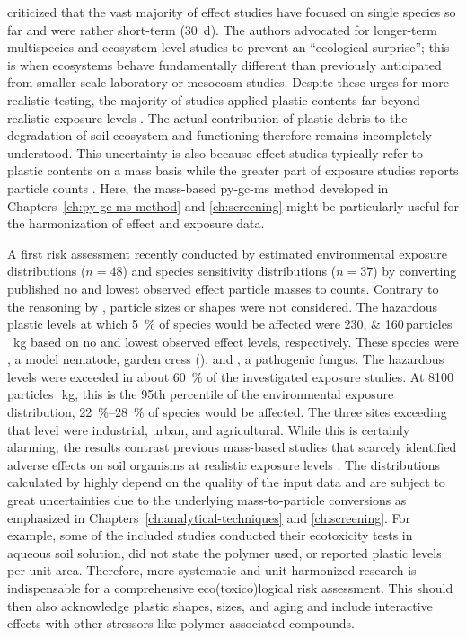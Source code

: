 \citet{BahoMicroplastics2021} criticized that the vast majority of effect studies have focused on single species so far and were rather short-term (\SI{30}{\day}). The authors advocated for longer-term multispecies and ecosystem level studies to prevent an ``ecological surprise''; this is when ecosystems behave fundamentally different than previously anticipated from smaller-scale laboratory or mesocosm studies. Despite these urges for more realistic testing, the majority of studies applied plastic contents far beyond realistic exposure levels \citep{BuksWhat2020}. The actual contribution of plastic debris to the degradation of soil ecosystem and functioning therefore remains incompletely understood. This uncertainty is also because effect studies typically refer to plastic contents on a mass basis while the greater part of exposure studies reports particle counts \citep{LeuschConverting2021}. Here, the mass-based \ac{py-gc-ms} method developed in Chapters~\ref{ch:py-gc-ms-method} and \ref{ch:screening} might be particularly useful for the harmonization of effect and exposure data.

A first risk assessment recently conducted by \citet{JacquesProbabilistic2021} estimated environmental exposure distributions ($n = 48$) and species sensitivity distributions ($n = 37$) by converting published no and lowest observed effect particle masses to counts. Contrary to the reasoning by \citet{BuksWhat2020}, particle sizes or shapes were not considered. The hazardous plastic levels at which \SI{5}{\percent} of species would be affected were \numlist{230;160}\,particles\,\si{\per\kilo\gram} based on no and lowest observed effect levels, respectively. These species were , a model nematode, garden cress (), and , a pathogenic fungus. The hazardous levels were exceeded in about \SI{60}{\percent} of the investigated exposure studies. At \num{8100}\,particles\,\si{\per\kilo\gram}, this is the \num{95}th percentile of the environmental exposure distribution, \SIrange{22}{28}{\percent} of species would be affected. The three sites exceeding that level were industrial, urban, and agricultural.
While this is certainly alarming, the results contrast previous mass-based studies that scarcely identified adverse effects on soil organisms at realistic exposure levels \citep{BuksWhat2020}. The distributions calculated by \citet{JacquesProbabilistic2021} highly depend on the quality of the input data and are subject to great uncertainties due to the underlying mass-to-particle conversions as emphasized in Chapters~\ref{ch:analytical-techniques} and \ref{ch:screening}. For example, some of the included studies conducted their ecotoxicity tests in aqueous soil solution, did not state the polymer used, or reported plastic levels per unit area.
Therefore, more systematic and unit-harmonized research is indispensable for a comprehensive eco(toxico)logical risk assessment. This should then also acknowledge plastic shapes, sizes, and aging and include interactive effects with other stressors like polymer-associated compounds.

